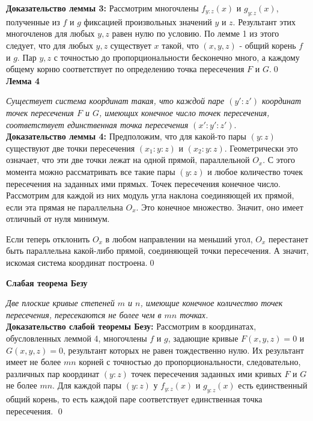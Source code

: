 \documentclass[a4paper, 12pt]{article}
\begin{document}
\textbf{Доказательство леммы 3:}\newline
Рассмотрим многочлены $f_{y:z}(x)$ и $g_{y:z}(x)$, полученные из $f$ и $g$ фиксацией произвольных значений $y$ и $z$. Результант этих многочленов для любых $y,z$ равен нулю по условию. По лемме 1 из этого следует, что для любых $y,z$ существует $x$ такой, что $(x,y,z)$ - общий корень $f$ и $g$. Пар $y,z$ с точностью до пропорциональности бесконечно много, а каждому общему корню соответствует по определению точка пересечения $F$ и $G$.\qed\\

\textbf{Лемма 4}

\textit{Существует система координат такая, что каждой паре $(y':z')$ координат точек пересечения $F$ и $G$, имеющих конечное число точек пересечения, соответствует единственная точка пересечения $(x':y':z').$}\\

\textbf{Доказательство леммы 4:}\newline
Предположим, что для какой-то пары $(y:z)$ существуют две точки пересечения $(x_1:y:z)$ и $(x_2:y:z)$. Геометрически это означает, что эти две точки лежат на одной прямой, параллельной $O_x$. С этого момента можно рассматривать все такие пары $(y:z)$ и любое количество точек пересечения на заданных ими прямых. Точек пересечения конечное число. Рассмотрим для каждой из них модуль угла наклона соединяющей их прямой, если эта прямая не параллельна $O_x$. Это конечное множество. Значит, оно имеет отличный от нуля минимум.\par Если теперь отклонить $O_x$ в любом направлении на меньший угол, $O_x$ перестанет быть параллельна какой-либо прямой, соединяющей точки пересечения. А значит, искомая система координат построена.\qed\newline

\textbf{Слабая теорема Безу}

\textit{Две плоские кривые степеней $m$ и $n$, имеющие конечное количество точек пересечения, пересекаются не более чем в $mn$ точках.}\\

\textbf{Доказательство слабой теоремы Безу:}\newline
Рассмотрим в координатах, обусловленных леммой 4, многочлены $f$ и $g$, задающие кривые $F(x,y,z) = 0$ и $G(x,y,z) = 0$, результант которых не равен тождественно нулю. Их результант имеет не более $mn$ корней с точностью до пропорциональности, следовательно, различных пар координат $(y:z)$ точек пересечения заданных ими кривых $F$ и $G$ не более $mn$. Для каждой пары $(y:z)$ у $f_{y:z}(x)$ и $g_{y:z}(x)$ есть единственный общий корень, то есть каждой паре соответствует единственная точка пересечения. \qed\newline
\end{document}
